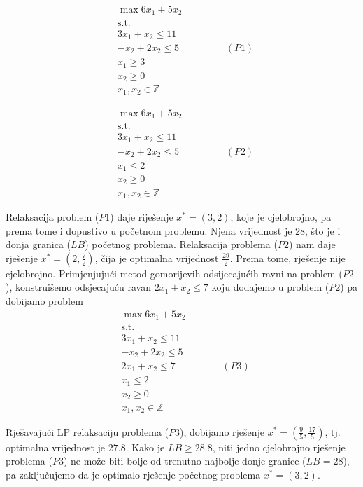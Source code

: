 \documentclass[a4paper, utf8, 11pt, colorlinks]{book}
\begin{document}
\begin{align*}
    &\max 6 x_1 + 5 x_2 \\
    & \mbox{s.t. } \\
    & 3x_1 + x_2 \leq 11 \\
    & - x_2 + 2 x_2 \leq 5 \hspace{2cm} (P1) \\
    & x_1 \geq 3 \\
    & x_2 \geq 0 \\
    & x_1, x_2 \in \mathbb{Z}
\end{align*}

\begin{align*}
    &\max 6 x_1 + 5 x_2 \\
    & \mbox{s.t. } \\
    & 3x_1 + x_2 \leq 11 \\
    & - x_2 + 2 x_2 \leq 5 \hspace{2cm} (P2) \\
    & x_1  \leq 2 \\
    & x_2 \geq 0 \\
    & x_1, x_2 \in \mathbb{Z}
\end{align*}

Relaksacija problem ($P1$) daje riješenje $x^*=(3,2)$, koje je cjelobrojno, pa prema tome i dopustivo u početnom problemu. Njena vrijednost je 28, što je i donja granica ($LB$) početnog problema. Relaksacija problema ($P2$) nam daje rješenje $x^*=(2, \frac{7}{2})$, čija je optimalna vrijednost $\frac{29}{2}$.  Prema tome, rješenje nije cjelobrojno. Primjenjujući metod gomorijevih odsijecajućih ravni na problem ($P2$), konstruišemo odsjecajuću ravan $2x_1 + x_2 \leq 7$ koju dodajemo u problem ($P2$) pa dobijamo problem 
\begin{align*}
    &\max 6 x_1 + 5 x_2 \\
    & \mbox{s.t. } \\
    & 3x_1 + x_2 \leq 11 \\
    & - x_2 + 2 x_2 \leq 5  \\
    & 2x_1 + x_2 \leq 7 \hspace{2cm} (P3)\\ 
    & x_1  \leq 2 \\
    & x_2 \geq 0 \\
    & x_1, x_2 \in \mathbb{Z}
\end{align*}

Rješavajući LP relaksaciju problema ($P3$), dobijamo rješenje $x^*=(\frac{9}{5}, \frac{17}{5})$, tj.  optimalna vrijednost je $27.8$. Kako je $LB \geq 28.8$, niti jedno cjelobrojno rješenje problema ($P3$) ne može biti bolje od trenutno najbolje donje granice ($LB=28$), pa zaključujemo da je optimalo rješenje početnog problema $x^*=(3,2)$. 
\end{document}
